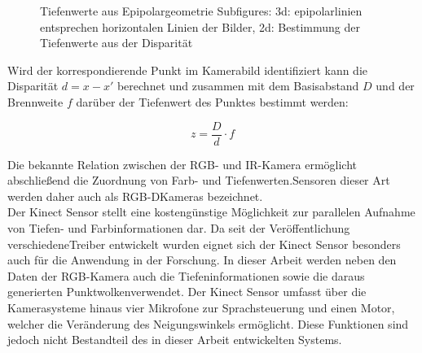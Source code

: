 \begin{figure}[ht]
	\begin{center}
		\caption{Tiefenwerte aus Epipolargeometrie Subfigures: 3d: epipolarlinien entsprechen horizontalen Linien der Bilder, 2d: Bestimmung der Tiefenwerte aus der Disparität}
		\label{fig.kinect_depth}
	\end{center}
\end{figure}

Wird der korrespondierende Punkt im Kamerabild identifiziert kann die Disparität $d = x - x'$ berechnet und zusammen mit dem Basisabstand $D$ und der Brennweite $f$ darüber der Tiefenwert des Punktes bestimmt werden:

\begin{equation}
z = \frac{D}{d}\cdot f
\end{equation}

Die bekannte Relation zwischen der RGB- und IR-Kamera ermöglicht abschließend die Zuordnung von Farb- und Tiefenwerten. Sensoren dieser Art werden daher auch als RGB-D\red[footnote] Kameras bezeichnet.\\

Der Kinect Sensor stellt eine kostengünstige Möglichkeit zur parallelen Aufnahme von Tiefen- und Farbinformationen dar. Da seit der Veröffentlichung verschiedene Treiber entwickelt wurden eignet sich der Kinect Sensor besonders auch für die Anwendung in der Forschung. In dieser Arbeit werden neben den Daten der RGB-Kamera auch die Tiefeninformationen sowie die daraus generierten Punktwolken\red[footnote?] verwendet. Der Kinect Sensor umfasst über die Kamerasysteme hinaus vier Mikrofone zur Sprachsteuerung und einen Motor, welcher die Veränderung des Neigungswinkels ermöglicht. Diese Funktionen sind jedoch nicht Bestandteil des in dieser Arbeit entwickelten Systems.\\


\\


